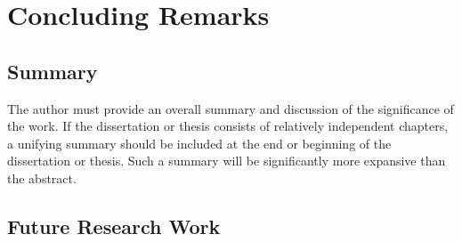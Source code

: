 

\chapter{Concluding Remarks}

\section{Summary}

The author must provide an overall summary and discussion of the significance of the work. If the dissertation or thesis consists of relatively independent chapters, a unifying summary should be included at the end or beginning of the dissertation or thesis. Such a summary will be significantly more expansive than the abstract.


\section{Future Research Work}


